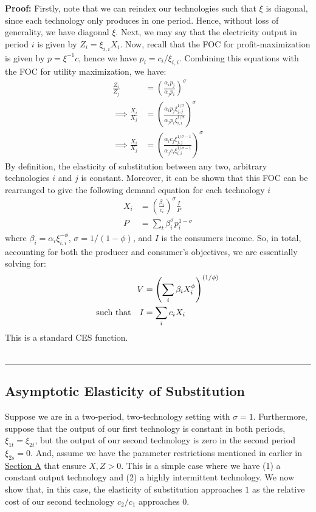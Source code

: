 \documentclass[11pt,a4paper]{extarticle}
\newenvironment{proof}[1][Proof]{\noindent\textbf{#1:} }{\ \rule{0.5em}{0.5em}}
\begin{document}
\begin{proof}
	Firstly, note that we can reindex our technologies such that $\xi$ is diagonal, since each technology only produces in one period. Hence, without loss of generality, we have diagonal $\xi$. Next, we may say that the electricity output in period $i$ is given by $Z_i = \xi_{i,i} X_i$. Now, recall that the FOC for profit-maximization is given by $p = \xi^{-1} c$, hence we have $p_i = c_i / \xi_{i,i}$.  Combining this equations with the FOC for utility maximization, we have:
	\begin{align*}
	\frac{Z_i}{Z_j} &= \left( \frac{\alpha_i p_j}{\alpha_j p_i} \right)^\sigma \\
	\implies \frac{ X_i }{X_j} &= \left( \frac{ \alpha_i p_j \xi_{j,j}^{1/\sigma} }{ \alpha_j p_i \xi_{i,i}^{1/\sigma} } \right)^\sigma \\
	\implies \frac{ X_i }{X_j} &= \left( \frac{ \alpha_i c_j \xi_{j,j}^{1/\sigma - 1} }{ \alpha_j c_i \xi_{i,i}^{1/\sigma - 1} } \right)^\sigma
	\end{align*}
	By definition, the elasticity of substitution between any two, arbitrary technologies $i$ and $j$ is constant. Moreover, it can be shown that this FOC can be rearranged to give the following demand equation for each technology $i$
	\begin{align}
	X_i &= \left(\frac{\beta_i}{c_i} \right)^\sigma \frac{I}{P} \\
	P &= \sum_t \beta_i^\sigma p_i^{1-\sigma}
	\end{align}
	where $\beta_i = \alpha_i \xi_{i,i}^{-\phi}$, $\sigma = 1 / (1-\phi)$, and $I$ is the consumers income.	So, in total, accounting for both the producer and consumer's objectives, we are essentially solving for: 
	\begin{align*} 
	V &= \left( \sum_i \beta_i X_i^\phi \right)^{(1/\phi)}  \\
	\text{such that\quad} I &= \sum_i c_i X_i 
	\end{align*}
	This is a standard CES function.
	\\ \hfill
\end{proof}

\subsection{Asymptotic Elasticity of Substitution}

\label{sec:asympeos}

Suppose we are in a two-period, two-technology setting with $\sigma = 1$. Furthermore, suppose that the output of our first technology is constant in both periods, $\xi_{1t} = \xi_{2t}$, but the output of our second technology is zero in the second period $\xi_{2s} = 0$. And, assume we have the parameter restrictions mentioned in earlier in \hyperref[sec:cobbdoug]{Section A} that ensure $X, Z > 0$. This is a simple case where we have (1) a constant output technology and (2) a highly intermittent technology. We now show that, in this case, the elasticity of substitution approaches $1$ as the relative cost of our second technology $c_2/c_1$ approaches $0$. 
\end{document}
